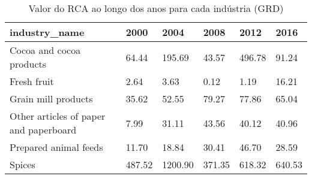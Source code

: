 \begin{table}
\centering
\caption{Valor do RCA ao longo dos anos para cada indústria (GRD)}
\begin{tabular}{p{6cm}p{1.5cm}p{1.5cm}p{1.5cm}p{1.5cm}p{1.5cm}}
\toprule
                         industry\_name &   2000 &    2004 &   2008 &   2012 &   2016 \\
\midrule
              Cocoa and cocoa products &  64.44 &  195.69 &  43.57 & 496.78 &  91.24 \\
                           Fresh fruit &   2.64 &    3.63 &   0.12 &   1.19 &  16.21 \\
                   Grain mill products &  35.62 &   52.55 &  79.27 &  77.86 &  65.04 \\
Other articles of paper and paperboard &   7.99 &   31.11 &  43.56 &  40.12 &  40.96 \\
                 Prepared animal feeds &  11.70 &   18.84 &  30.41 &  46.70 &  28.59 \\
                                Spices & 487.52 & 1200.90 & 371.35 & 618.32 & 640.53 \\
\bottomrule
\end{tabular}
\end{table}
